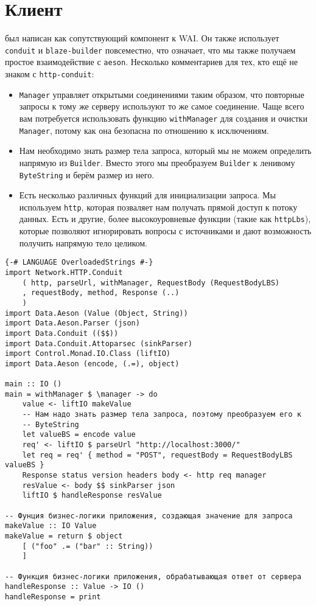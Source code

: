 \section {Клиент}

 был написан как сопутствующий компонент к WAI. Он также использует \lstinline!conduit! и \lstinline!blaze-builder! повсеместно, что означает, что мы также получаем простое взаимодействие с \lstinline!aeson!. Несколько комментариев для тех, кто ещё не знаком с \lstinline!http-conduit!:

\begin{itemize}
  \item \lstinline!Manager! управляет открытыми соединениями таким образом, что повторные запросы к тому же серверу используют то же самое соединение. Чаще всего вам потребуется использовать функцию \lstinline!withManager! для создания и очистки \lstinline!Manager!, потому как она безопасна по отношению к исключениям.
  \item Нам необходимо знать размер тела запроса, который мы не можем определить напрямую из \lstinline!Builder!. Вместо этого мы преобразуем \lstinline!Builder! к ленивому \lstinline!ByteString! и берём размер из него.
  \item Есть несколько различных функций для инициализации запроса. Мы используем \lstinline!http!, которая позваляет нам получать прямой доступ к потоку данных. Есть и другие, более высокоуровневые функции (такие как \lstinline!httpLbs!), которые позволяют игнорировать вопросы с источниками и дают возможность получить напрямую тело целиком.
\end{itemize}

\begin{lstlisting}
{-# LANGUAGE OverloadedStrings #-}
import Network.HTTP.Conduit
    ( http, parseUrl, withManager, RequestBody (RequestBodyLBS)
    , requestBody, method, Response (..)
    )
import Data.Aeson (Value (Object, String))
import Data.Aeson.Parser (json)
import Data.Conduit (($$))
import Data.Conduit.Attoparsec (sinkParser)
import Control.Monad.IO.Class (liftIO)
import Data.Aeson (encode, (.=), object)

main :: IO ()
main = withManager $ \manager -> do
    value <- liftIO makeValue
    -- Нам надо знать размер тела запроса, поэтому преобразуем его к
    -- ByteString
    let valueBS = encode value
    req' <- liftIO $ parseUrl "http://localhost:3000/"
    let req = req' { method = "POST", requestBody = RequestBodyLBS valueBS }
    Response status version headers body <- http req manager
    resValue <- body $$ sinkParser json
    liftIO $ handleResponse resValue

-- Фунция бизнес-логики приложения, создающая значение для запроса
makeValue :: IO Value
makeValue = return $ object
    [ ("foo" .= ("bar" :: String))
    ]

-- Функция бизнес-логики приложения, обрабатывающая ответ от сервера
handleResponse :: Value -> IO ()
handleResponse = print
\end{lstlisting}
